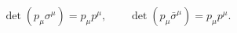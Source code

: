 
\begin{equation}
{
\det(p_\mu\sigma^\mu)=p_\mu p^\mu,
\qquad
\det(p_\mu\bar\sigma^\mu)=p_\mu p^\mu.}
\label{eq:weyl-determinant-mass-shell-dp21}
\end{equation}

